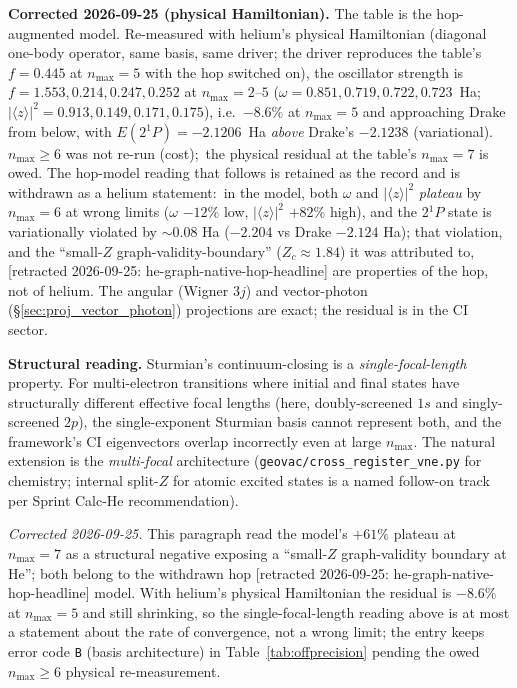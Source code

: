 \documentclass[11pt]{article}
\begin{document}
\textbf{Corrected 2026-09-25 (physical Hamiltonian).}  The table is the
hop-augmented model.  Re-measured with helium's physical Hamiltonian
(diagonal one-body operator, same basis, same driver; the driver
reproduces the table's $f = 0.445$ at $n_{\max}=5$ with the hop
switched on), the oscillator strength is
$f = 1.553, 0.214, 0.247, 0.252$ at $n_{\max} = 2$--$5$
($\omega = 0.851, 0.719, 0.722, 0.723$~Ha;
$|\langle z\rangle|^2 = 0.913, 0.149, 0.171, 0.175$), i.e.\
$-8.6\%$ at $n_{\max} = 5$ and approaching Drake from below, with
$E(2{}^1\!P) = -2.1206$~Ha \emph{above} Drake's $-2.1238$ (variational).
$n_{\max} \ge 6$ was not re-run (cost);\ the physical residual at the
table's $n_{\max} = 7$ is owed.  The hop-model reading that follows is
retained as the record and is withdrawn as a helium statement:\ in the
model, both $\omega$ and $|\langle z\rangle|^2$ \emph{plateau} by
$n_{\max} = 6$ at wrong limits ($\omega$ $-12\%$ low,
$|\langle z\rangle|^2$ $+82\%$ high), and the $2{}^1\!P$ state is
variationally violated by $\sim 0.08$ Ha ($-2.204$ vs Drake
$-2.124$ Ha); that violation, and the ``small-$Z$
graph-validity-boundary'' ($Z_c \approx 1.84$) it was attributed to, [retracted 2026-09-25: he-graph-native-hop-headline]
are properties of the hop, not of helium.
The angular (Wigner $3j$) and vector-photon
(\S\ref{sec:proj_vector_photon}) projections are exact; the residual
is in the CI sector.

\textbf{Structural reading.}  Sturmian's continuum-closing is a
\emph{single-focal-length} property.  For multi-electron transitions where
initial and final states have structurally different effective focal lengths
(here, doubly-screened $1s$ and singly-screened $2p$), the single-exponent
Sturmian basis cannot represent both, and the framework's CI eigenvectors
overlap incorrectly even at large $n_{\max}$.  The natural extension is the
\emph{multi-focal} architecture (\verb|geovac/cross_register_vne.py| for
chemistry; internal split-$Z$ for atomic excited states is a named
follow-on track per Sprint Calc-He recommendation).

\emph{Corrected 2026-09-25.}  This paragraph read the model's $+61\%$
plateau at $n_{\max} = 7$ as a structural negative exposing a ``small-$Z$
graph-validity boundary at He''; both belong to the withdrawn hop [retracted 2026-09-25: he-graph-native-hop-headline]
model.  With helium's physical Hamiltonian the residual is $-8.6\%$ at
$n_{\max} = 5$ and still shrinking, so the single-focal-length reading
above is at most a statement about the rate of convergence, not a wrong
limit; the entry keeps error code \texttt{B} (basis architecture) in
Table~\ref{tab:offprecision} pending the owed $n_{\max} \ge 6$
physical re-measurement.
\end{document}
